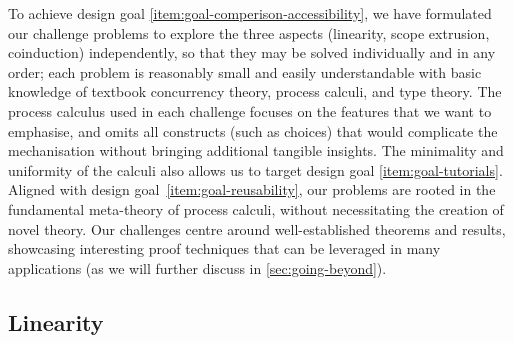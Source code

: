 \documentclass[runningheads]{llncs}
\begin{document}
To achieve design goal \ref{item:goal-comperison-accessibility}, we have
formulated our challenge problems to explore the three aspects
(linearity, scope extrusion, coinduction) independently, so that they
may be solved individually and in any order; each problem is
reasonably small and easily understandable with basic knowledge of
textbook concurrency theory, process calculi, and type theory.  The
process calculus used in each challenge focuses on the features that
we want to emphasise, and omits all constructs (such as choices) that
would complicate the mechanisation without bringing additional
tangible insights.  The minimality and uniformity of the
calculi also allows us to target design goal
\ref{item:goal-tutorials}.
Aligned with design goal~\ref{item:goal-reusability}, our problems are rooted in the fundamental meta-theory of process calculi, without necessitating the creation of novel theory.
Our challenges centre around well-established theorems and results, showcasing interesting proof techniques that can be leveraged in many applications (as we will further discuss in \cref{sec:going-beyond}).

\subsection{Linearity}

\end{document}

